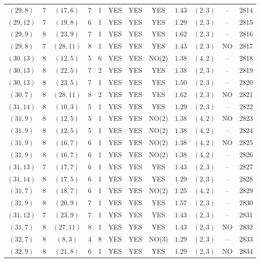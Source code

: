 \begin{longtable}{|c|c|c|c|c|c|c|c|c|c|c|c|}
$(29,8)$ & 7 & $(17,6)$ & 7 & 1 & YES & YES & YES & $1.43$ & $(2,3)$ & -- & 2814\\
$(29,12)$ & 7 & $(19,8)$ & 6 & 1 & YES & YES & YES & $1.29$ & $(2,3)$ & -- & 2815\\
$(29,9)$ & 8 & $(23,9)$ & 7 & 1 & YES & YES & YES & $1.62$ & $(2,3)$ & -- & 2816\\
$(29,8)$ & 7 & $(28,11)$ & 8 & 1 & YES & YES & YES & $1.43$ & $(2,3)$ & NO & 2817\\
$(30,13)$ & 8 & $(12,5)$ & 5 & 6 & YES & YES & NO(2) & $1.38$ & $(4,2)$ & -- & 2818\\
$(30,13)$ & 8 & $(22,5)$ & 7 & 2 & YES & YES & YES & $1.38$ & $(2,3)$ & -- & 2819\\
$(30,13)$ & 8 & $(23,5)$ & 7 & 1 & YES & YES & YES & $1.50$ & $(2,3)$ & -- & 2820\\
$(30,7)$ & 8 & $(28,11)$ & 8 & 2 & YES & YES & YES & $1.62$ & $(2,3)$ & NO & 2821\\
$(31,14)$ & 8 & $(10,3)$ & 5 & 1 & YES & YES & YES & $1.29$ & $(2,3)$ & -- & 2822\\
$(31,9)$ & 8 & $(12,5)$ & 5 & 1 & YES & YES & NO(2) & $1.38$ & $(4,2)$ & NO & 2823\\
$(31,9)$ & 8 & $(12,5)$ & 5 & 1 & YES & YES & NO(2) & $1.38$ & $(4,2)$ & -- & 2824\\
$(31,9)$ & 8 & $(16,7)$ & 6 & 1 & YES & YES & NO(2) & $1.38$ & $(4,2)$ & NO & 2825\\
$(31,9)$ & 8 & $(16,7)$ & 6 & 1 & YES & YES & NO(2) & $1.38$ & $(4,2)$ & -- & 2826\\
$(31,13)$ & 7 & $(17,7)$ & 6 & 1 & YES & YES & YES & $1.43$ & $(2,3)$ & -- & 2827\\
$(31,14)$ & 8 & $(17,5)$ & 6 & 1 & YES & YES & YES & $1.29$ & $(2,3)$ & -- & 2828\\
$(31,7)$ & 8 & $(18,7)$ & 6 & 1 & YES & YES & NO(2) & $1.25$ & $(4,2)$ & -- & 2829\\
$(31,9)$ & 8 & $(20,9)$ & 7 & 1 & YES & YES & YES & $1.57$ & $(2,3)$ & -- & 2830\\
$(31,12)$ & 7 & $(23,9)$ & 7 & 1 & YES & YES & YES & $1.43$ & $(2,3)$ & -- & 2831\\
$(31,7)$ & 8 & $(27,11)$ & 8 & 1 & YES & YES & YES & $1.43$ & $(2,3)$ & NO & 2832\\
$(32,7)$ & 8 & $(8,3)$ & 4 & 8 & YES & YES & NO(3) & $1.29$ & $(2,3)$ & -- & 2833\\
$(32,9)$ & 8 & $(21,8)$ & 6 & 1 & YES & YES & YES & $1.29$ & $(2,3)$ & NO & 2834\\

\end{longtable}
